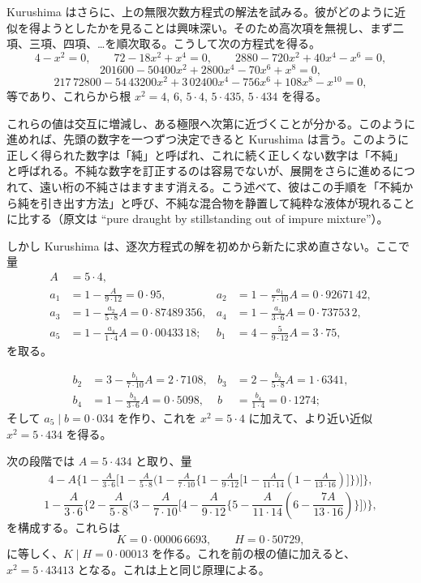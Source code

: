 \documentclass[11pt]{article}
\newcommand{\scanpage}[2]{\clearpage\setcounter{footnote}{0}\noindent{\footnotesize\color{gray}PDF #1 頁 · #2}\par\medskip}
\newcommand{\scanfooter}{}
\newcommand{\dd}{\mathbin{\cdot}}
\begin{document}
Kurushima はさらに、上の無限次数方程式の解法を試みる。彼がどのように近似を得ようとしたかを見ることは興味深い。そのため高次項を無視し、まず二項、三項、四項、\ldots を順次取る。こうして次の方程式を得る。
\[
4-x^2=0,
\qquad 72-18x^2+x^4=0,
\qquad 2880-720x^2+40x^4-x^6=0,
\]
\[
201600-50400x^2+2800x^4-70x^6+x^8=0,
\]
\[
217\,72800-54\,43200x^2+3\,02400x^4-756x^6+108x^8-x^{10}=0,
\]
等であり、これらから根 $x^2=4$, $6$, $5\dd4$, $5\dd435$, $5\dd434$ を得る。

これらの値は交互に増減し、ある極限へ次第に近づくことが分かる。このように進めれば、先頭の数字を一つずつ決定できると Kurushima は言う。このように正しく得られた数字は「純」と呼ばれ、これに続く正しくない数字は「不純」と呼ばれる。不純な数字を訂正するのは容易でないが、展開をさらに進めるにつれて、遠い桁の不純さはますます消える。こう述べて、彼はこの手順を「不純から純を引き出す方法」と呼び、不純な混合物を静置して純粋な液体が現れることに比する（原文は ``pure draught by stillstanding out of impure mixture''）。

しかし Kurushima は、逐次方程式の解を初めから新たに求め直さない。ここで量
\[
\begin{aligned}
A&=5\dd4,\\
a_1&=1-\frac{A}{9\dd12}=0\dd95,
& a_2&=1-\frac{a_1}{7\dd10}A=0\dd92671\,42,\\
a_3&=1-\frac{a_2}{5\dd8}A=0\dd87489\,356,
& a_4&=1-\frac{a_3}{3\dd6}A=0\dd73753\,2,\\
a_5&=1-\frac{a_4}{1\dd4}A=0\dd00433\,18;
& b_1&=4-\frac5{9\dd12}A=3\dd75,
\end{aligned}
\]
を取る。
\scanfooter

\scanpage{0235}{第30章、印刷頁221}
\[
\begin{aligned}
b_2&=3-\frac{b_1}{7\dd10}A=2\dd7108,
& b_3&=2-\frac{b_2}{5\dd8}A=1\dd6341,\\
b_4&=1-\frac{b_3}{3\dd6}A=0\dd5098,
& b&=\frac{b_4}{1\dd4}=0\dd1274;
\end{aligned}
\]
そして $a_5\mid b=0\dd034$ を作り、これを $x^2=5\dd4$ に加えて、より近い近似 $x^2=5\dd434$ を得る。

次の段階では $A=5\dd434$ と取り、量
\[
\begin{aligned}
4-A\Bigg\{1-\frac{A}{3\dd6}\Bigg[1-\frac{A}{5\dd8}\Bigg(1-\frac{A}{7\dd10}\Bigg\{1-\frac{A}{9\dd12}\Bigg[1-\frac{A}{11\dd14}\left(1-\frac{A}{13\dd16}\right)\Bigg]\Bigg\}\Bigg)\Bigg]\Bigg\},
\end{aligned}
\]
\[
1-\frac{A}{3\dd6}\Bigg\{2-\frac{A}{5\dd8}\Bigg(3-\frac{A}{7\dd10}\Bigg[4-\frac{A}{9\dd12}\Bigg\{5-\frac{A}{11\dd14}\left(6-\frac{7A}{13\dd16}\right)\Bigg\}\Bigg]\Bigg)\Bigg\},
\]
を構成する。これらは
\[
K=0\dd00006\,6693,
\qquad H=0\dd50729,
\]
に等しく、$K\mid H=0\dd00013$ を作る。これを前の根の値に加えると、$x^2=5\dd43413$ となる。これは上と同じ原理による。
\end{document}
